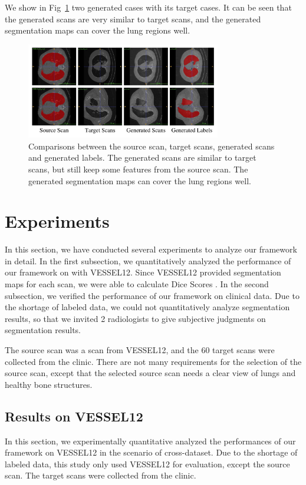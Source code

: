\documentclass{article}
\begin{document}
We show in Fig~\ref{generatedata} two generated cases with its target cases. It can be seen that the generated scans are very similar to target scans, and the generated segmentation maps can cover the lung regions well.

\begin{figure}[htbp]
\centerline{\includegraphics[width=85mm]{generatedata.pdf}}
\vspace{-0.5cm}
\caption{Comparisons between the source scan, target scans, generated scans and generated labels. The generated scans are similar to target scans, but still keep some features from the source scan. The generated segmentation maps can cover the lung regions well.
}
\vspace{-0.3cm}
\label{generatedata}
\end{figure}

\section{Experiments}
\label{sec:experiments}
In this section, we have conducted several experiments to analyze our framework in detail. 
In the first subsection, we quantitatively analyzed the performance of our framework on with VESSEL12. Since VESSEL12 provided segmentation maps for each scan, we were able to calculate Dice Scores \cite{dice1945measures}.
In the second subsection, we verified the performance of our framework on clinical data.
Due to the shortage of labeled data, we could not quantitatively analyze segmentation results, so that we invited 2 radiologists to give subjective judgments on segmentation results.

The source scan was a scan from VESSEL12, and the 60 target scans were collected from the clinic.
There are not many requirements for the selection of the source scan, except that the selected source scan needs a clear view of lungs and healthy bone structures.

\subsection{Results on VESSEL12}
\label{subsec:vessel}
In this section, we experimentally quantitative analyzed the performances of our framework on VESSEL12 in the scenario of cross-dataset. Due to the shortage of labeled data, this study only used VESSEL12 for evaluation, except the source scan. The target scans were collected from the clinic.
\end{document}

